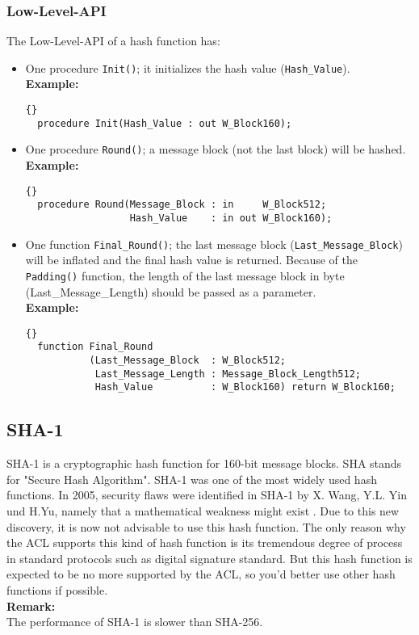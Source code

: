 \subsubsection*{Low-Level-API}
The Low-Level-API of a hash function has:
\begin{itemize}
\item One procedure \texttt{Init()}; it initializes the hash value (\texttt{Hash\_Value}).\\
\textbf{Example:}
\begin{lstlisting}{}
  procedure Init(Hash_Value : out W_Block160);
\end{lstlisting}
\item One procedure \texttt{Round()}; a message block (not the last block) will be hashed.\\
\textbf{Example:}
\begin{lstlisting}{}
  procedure Round(Message_Block : in     W_Block512;
                  Hash_Value    : in out W_Block160);
\end{lstlisting}
\item One function \texttt{Final\_Round()}; the last message block
  (\texttt{Last\_Message\_Block}) will be inflated and the final hash
  value is returned. Because of the \texttt{Padding()} function, the
  length of the last message block in byte (Last\_Message\_Length)
  should be passed as a parameter.\\

\noindent\textbf{Example:}
\begin{lstlisting}{}
  function Final_Round
           (Last_Message_Block  : W_Block512;
            Last_Message_Length : Message_Block_Length512;
            Hash_Value          : W_Block160) return W_Block160;
\end{lstlisting}
\end{itemize}

\subsection{SHA-1}\label{SHA-1}
SHA-1 is a cryptographic hash function for 160-bit message blocks. SHA
stands for "Secure Hash Algorithm". SHA-1 was one of the most widely
used hash functions. In 2005, security flaws were identified in SHA-1
by X. Wang, Y.L. Yin und H.Yu, namely that a mathematical weakness
might exist \cite{DBLP:conf/crypto/WangYY05a}. Due to this new
discovery, it is now not advisable to use this hash function. The only
reason why the ACL supports this kind of hash function is its
tremendous degree of process in standard protocols such as digital
signature standard. But this hash function is expected to be no more
supported by the ACL, so you'd better use other hash functions if
possible. \\ \textbf{Remark:}\\ The performance of SHA-1 is slower
than SHA-256.
